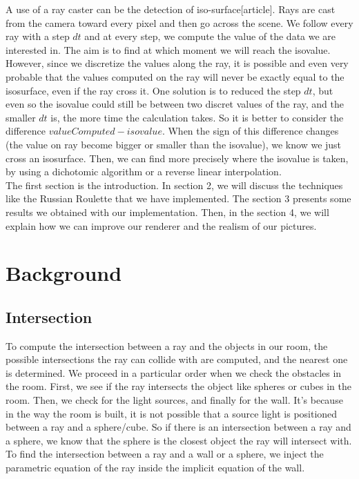 \documentclass[12pt]{article}
\numberwithin{equation}{section}
\begin{document}
A use of a ray caster can be the detection of iso-surface[article]. Rays are cast from the camera toward every pixel and then go across the scene. We follow every ray with a step $dt$ and at every step, we compute the value of the data we are interested in. The aim is to find at which moment we will reach the isovalue. However, since we discretize the values along the ray, it is possible and even very probable that the values computed on the ray will never be exactly equal to the isosurface, even if the ray cross it. One solution is to reduced the step $dt$, but even so the isovalue could still be between two discret values of the ray, and the smaller $dt$ is, the more time the calculation takes. So it is better to consider the difference $valueComputed - isovalue$. When the sign of this difference changes (the value on ray become bigger or smaller than the isovalue), we know we just cross an isosurface. Then, we can find more precisely where the isovalue is taken, by using a dichotomic algorithm or a reverse linear interpolation.\\

The first section is the introduction. In section 2, we will discuss the techniques like the Russian Roulette that we have implemented. The section 3 presents some results we obtained with our implementation. Then, in the section 4, we will explain how we can improve our renderer and the realism of our pictures. 

\section{Background}

\subsection{Intersection}

To compute the intersection between a ray and the objects in our room, the possible intersections the ray can collide with are computed, and the nearest one is determined. We proceed in a particular order when we check the obstacles in the room. First, we see if the ray intersects the object like spheres or cubes in the room. Then, we check for the light sources, and finally for the wall. It's because in the way the room is built, it is not possible that a source light is positioned between a ray and a sphere/cube. So if there is an intersection between a ray and a sphere, we know that the sphere is the closest object the ray will intersect with. To find the intersection between a ray and a wall or a sphere, we inject the parametric equation of the ray inside the implicit equation of the wall.
\end{document}
